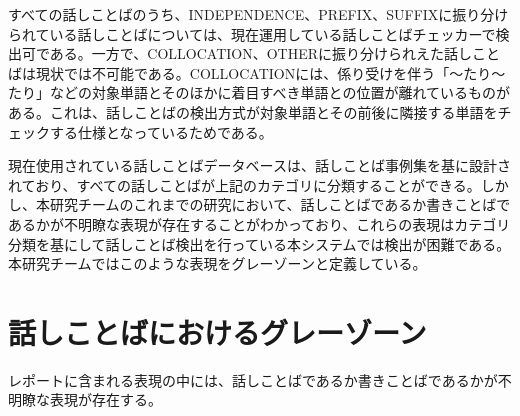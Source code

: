 すべての話しことばのうち、INDEPENDENCE、PREFIX、SUFFIXに振り分けられている話しことばについては、現在運用している話しことばチェッカーで検出可である。一方で、COLLOCATION、OTHERに振り分けられえた話しことばは現状では不可能である。COLLOCATIONには、係り受けを伴う「～たり～たり」などの対象単語とそのほかに着目すべき単語との位置が離れているものがある。これは、話しことばの検出方式が対象単語とその前後に隣接する単語をチェックする仕様となっているためである。

現在使用されている話しことばデータベースは、話しことば事例集を基に設計されており、すべての話しことばが上記のカテゴリに分類することができる。しかし、本研究チームのこれまでの研究において、話しことばであるか書きことばであるかが不明瞭な表現が存在することがわかっており、これらの表現はカテゴリ分類を基にして話しことば検出を行っている本システムでは検出が困難である。本研究チームではこのような表現をグレーゾーンと定義している。

\section{話しことばにおけるグレーゾーン}
レポートに含まれる表現の中には、話しことばであるか書きことばであるかが不明瞭な表現が存在する。

